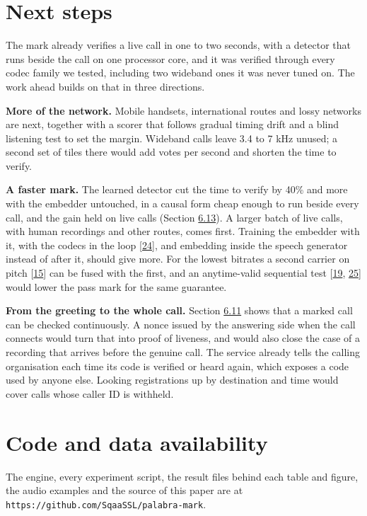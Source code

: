 \documentclass[10pt,a4paper]{article}
\begin{document}
\section{Next steps}\label{s-9}

The mark already verifies a live call in one to two seconds, with a detector that runs beside the call on one processor core, and it was verified through every codec family we tested, including two wideband ones it was never tuned on. The work ahead builds on that in three directions.

\textbf{More of the network.} Mobile handsets, international routes and lossy networks are next, together with a scorer that follows gradual timing drift and a blind listening test to set the margin. Wideband calls leave 3.4 to 7 kHz unused; a second set of tiles there would add votes per second and shorten the time to verify.

\textbf{A faster mark.} The learned detector cut the time to verify by 40\% and more with the embedder untouched, in a causal form cheap enough to run beside every call, and the gain held on live calls (Section \hyperref[s-6-13]{6.13}). A larger batch of live calls, with human recordings and other routes, comes first. Training the embedder with it, with the codecs in the loop {[}\hyperlink{ref-24}{24}{]}, and embedding inside the speech generator instead of after it, should give more. For the lowest bitrates a second carrier on pitch {[}\hyperlink{ref-15}{15}{]} can be fused with the first, and an anytime-valid sequential test {[}\hyperlink{ref-19}{19}, \hyperlink{ref-25}{25}{]} would lower the pass mark for the same guarantee.

\textbf{From the greeting to the whole call.} Section \hyperref[s-6-11]{6.11} shows that a marked call can be checked continuously. A nonce issued by the answering side when the call connects would turn that into proof of liveness, and would also close the case of a recording that arrives before the genuine call. The service already tells the calling organisation each time its code is verified or heard again, which exposes a code used by anyone else. Looking registrations up by destination and time would cover calls whose caller ID is withheld.

\section{Code and data availability}\label{s-10}

The engine, every experiment script, the result files behind each table and figure, the audio examples and the source of this paper are at \texttt{https://github.com/SqaaSSL/palabra-mark}.
\end{document}
